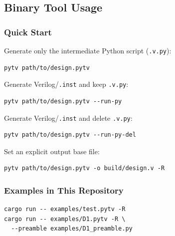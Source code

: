 \subsection{Binary Tool Usage}
\subsubsection*{Quick Start}
Generate only the intermediate Python script (\texttt{.v.py}):
\begin{verbatim}
pytv path/to/design.pytv
\end{verbatim}

Generate Verilog/\texttt{.inst} and keep \texttt{.v.py}:
\begin{verbatim}
pytv path/to/design.pytv --run-py
\end{verbatim}

Generate Verilog/\texttt{.inst} and delete \texttt{.v.py}:
\begin{verbatim}
pytv path/to/design.pytv --run-py-del
\end{verbatim}

Set an explicit output base file:
\begin{verbatim}
pytv path/to/design.pytv -o build/design.v -R
\end{verbatim}

\subsubsection*{Examples in This Repository}
\begin{verbatim}
cargo run -- examples/test.pytv -R
cargo run -- examples/D1.pytv -R \
  --preamble examples/D1_preamble.py
\end{verbatim}

